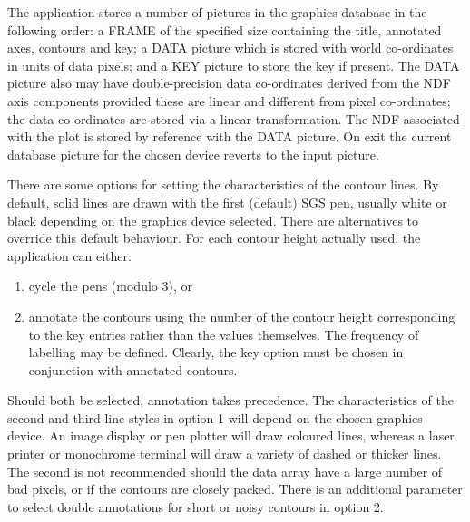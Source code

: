 {{{{         \sstitem
         The application stores a number of pictures in the graphics
         database in the following order: a FRAME of the specified size
         containing the title, annotated axes, contours and key; a DATA
         picture which is stored with world co-ordinates in units of data
         pixels; and a KEY picture to store the key if present.  The DATA
         picture also may have double-precision data co-ordinates derived
         from the NDF axis components provided these are linear and
         different from pixel co-ordinates; the data co-ordinates are
         stored via a linear transformation.  The NDF associated with the
         plot is stored by reference with the DATA picture.  On exit the
         current database picture for the chosen device reverts to the
         input picture.

         \sstitem
         There are some options for setting the characteristics of the
         contour lines.  By default, solid lines are drawn with the first
         (default) SGS pen, usually white or black depending on the
         graphics device selected.  There are alternatives to override
         this default behaviour. For each contour height actually used,
         the application can either:
        \begin{enumerate}
         \item cycle the pens (modulo 3), or
         \item annotate the contours using the number of the contour 
               height corresponding to the key entries rather than the
               values themselves.  The frequency of labelling may be defined.
               Clearly, the key option must be chosen in conjunction with
               annotated contours.
         \end{enumerate}
         Should both be selected, annotation takes precedence.  The
         characteristics of the second and third line styles in option 1
         will depend on the chosen graphics device. An image display or
         pen plotter will draw coloured lines, whereas a laser printer or
         monochrome terminal will draw a variety of dashed or thicker
         lines.  The second is not recommended should the data array have
         a large number of bad pixels, or if the contours are closely
         packed. There is an additional parameter to select double
         annotations for short or noisy contours in option 2.
      }
   }
   \sstimplementationstatus{
      \sstitemlist{

}}}}
